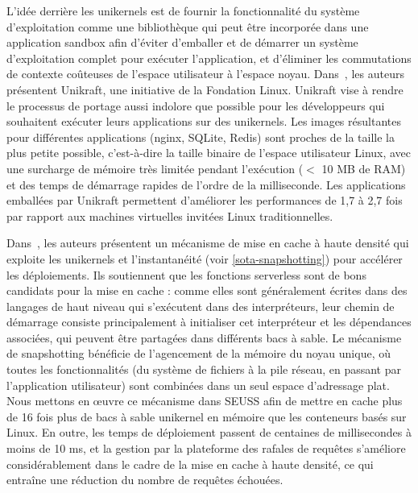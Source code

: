 L'idée derrière les unikernels est de fournir la fonctionnalité du système d'exploitation comme une bibliothèque qui peut être incorporée dans une application sandbox afin d'éviter d'emballer et de démarrer un système d'exploitation complet pour exécuter l'application, et d'éliminer les commutations de contexte coûteuses de l'espace utilisateur à l'espace noyau. Dans~\cite{kuenzerUnikraftFastSpecialized2021a}, les auteurs présentent Unikraft, une initiative de la Fondation Linux. Unikraft vise à rendre le processus de portage aussi indolore que possible pour les développeurs qui souhaitent exécuter leurs applications sur des unikernels. Les images résultantes pour différentes applications (nginx, SQLite, Redis) sont proches de la taille la plus petite possible, c'est-à-dire la taille binaire de l'espace utilisateur Linux, avec une surcharge de mémoire très limitée pendant l'exécution ($<$ 10 MB de RAM) et des temps de démarrage rapides de l'ordre de la milliseconde. Les applications emballées par Unikraft permettent d'améliorer les performances de 1,7 à 2,7 fois par rapport aux machines virtuelles invitées Linux traditionnelles.

Dans~\cite{caddenSEUSSSkipRedundant2020}, les auteurs présentent un mécanisme de mise en cache à haute densité qui exploite les unikernels et l'instantanéité (voir \ref{sota-snapshotting}) pour accélérer les déploiements. Ils soutiennent que les fonctions serverless sont de bons candidats pour la mise en cache : comme elles sont généralement écrites dans des langages de haut niveau qui s'exécutent dans des interpréteurs, leur chemin de démarrage consiste principalement à initialiser cet interpréteur et les dépendances associées, qui peuvent être partagées dans différents bacs à sable. Le mécanisme de snapshotting bénéficie de l'agencement de la mémoire du noyau unique, où toutes les fonctionnalités (du système de fichiers à la pile réseau, en passant par l'application utilisateur) sont combinées dans un seul espace d'adressage plat. Nous mettons en œuvre ce mécanisme dans SEUSS afin de mettre en cache plus de 16 fois plus de bacs à sable unikernel en mémoire que les conteneurs basés sur Linux. En outre, les temps de déploiement passent de centaines de millisecondes à moins de 10 ms, et la gestion par la plateforme des rafales de requêtes s'améliore considérablement dans le cadre de la mise en cache à haute densité, ce qui entraîne une réduction du nombre de requêtes échouées.

